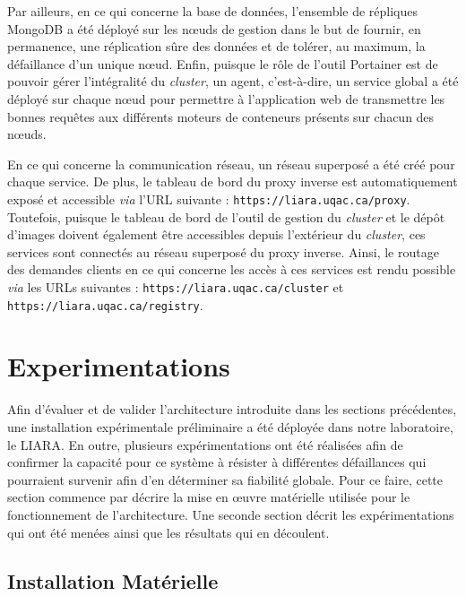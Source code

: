 Par ailleurs, en ce qui concerne la base de données, l'ensemble de répliques MongoDB a été déployé sur les n\oe{}uds de gestion dans le but de fournir, en permanence, une réplication sûre des données et de tolérer, au maximum, la défaillance d'un unique n\oe{}ud. Enfin, puisque le rôle de l'outil Portainer est de pouvoir gérer l'intégralité du \textit{cluster}, un agent, c'est-à-dire, un service global a été déployé sur chaque n\oe{}ud pour permettre à l'application web de transmettre les bonnes requêtes aux différents moteurs de conteneurs présents sur chacun des n\oe{}uds.

En ce qui concerne la communication réseau, un réseau superposé a été créé pour chaque service. De plus, le tableau de bord du proxy inverse est automatiquement exposé et accessible \textit{via} l'\acs{URL} suivante : \texttt{https://liara.uqac.ca/proxy}. Toutefois, puisque le tableau de bord de l'outil de gestion du \textit{cluster} et le dépôt d'images doivent également être accessibles depuis l'extérieur du \textit{cluster}, ces services sont connectés au réseau superposé du proxy inverse. Ainsi, le routage des demandes clients en ce qui concerne les accès à ces services est rendu possible \textit{via} les \acsp{URL} suivantes : \texttt{https://liara.uqac.ca/cluster} et \texttt{https://liara.uqac.ca/registry}.

\section{Experimentations}

Afin d'évaluer et de valider l'architecture introduite dans les sections précédentes, une installation expérimentale préliminaire a été déployée dans notre laboratoire, le \acs{LIARA}. En outre, plusieurs expérimentations ont été réalisées afin de confirmer la capacité pour ce système à résister à différentes défaillances qui pourraient survenir afin d'en déterminer sa fiabilité globale. Pour ce faire, cette section commence par décrire la mise en \oe{}uvre matérielle utilisée pour le fonctionnement de l'architecture. Une seconde section décrit les expérimentations qui ont été menées ainsi que les résultats qui en découlent.

\subsection{Installation Matérielle}

